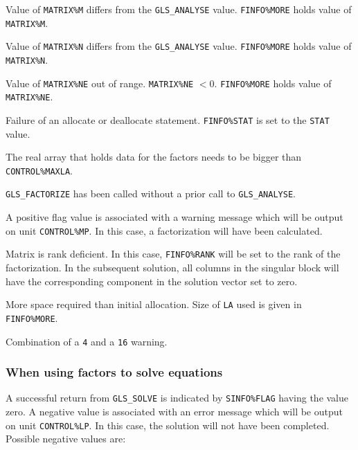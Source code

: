 \documentclass{galahad}
\newcommand{\packagename}{GLS}
\begin{document}
\begin{description}

  Value of {\tt MATRIX\%M} differs from the {\tt \packagename\_ANALYSE} 
value. {\tt FINFO\%MORE} holds value of {\tt MATRIX\%M}.

  Value of {\tt MATRIX\%N} differs from the {\tt \packagename\_ANALYSE} 
value. {\tt FINFO\%MORE} holds value of {\tt MATRIX\%N}.

  Value of {\tt MATRIX\%NE} out of range.  {\tt MATRIX\%NE} $<0$. 
{\tt FINFO\%MORE} holds value of {\tt MATRIX\%NE}.

  Failure of an allocate or deallocate statement. {\tt FINFO\%STAT} 
is set to the {\tt STAT} value. 

 The real array that holds data for the factors
  needs to be bigger than {\tt CONTROL\%MAXLA}. 

 {\tt \packagename\_FACTORIZE} has been called without a prior call to
 {\tt \packagename\_ANALYSE}.

\end{description}

\noindent
A positive flag value is associated with a warning message
which will  be output on unit {\tt CONTROL\%MP}. In this case, 
a factorization will have been calculated.

\begin{description}

  Matrix is rank deficient.  In this case, {\tt FINFO\%RANK} will be
set to the rank of the factorization.  In the subsequent solution,
all columns in the singular block will have the corresponding component in
the solution vector set to zero.

 More space required than initial allocation.  Size of {\tt LA} used 
 is given in {\tt FINFO\%MORE}.

 Combination of a {\tt 4} and a {\tt 16} warning.

\end{description}

\subsubsection{When using factors to solve equations} \label{errors}

A successful return from {\tt \packagename\_SOLVE} is indicated by
{\tt SINFO\%FLAG} having the value zero.  A negative value is
associated with an error message which will  be output on unit
{\tt CONTROL\%LP}. In this case, the solution will not have been completed.
Possible negative values are:
\end{document}

